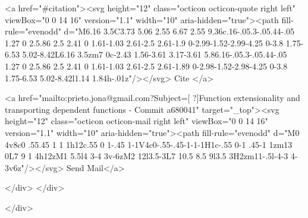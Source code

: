       <a  href="#citation"><svg height="12" class="octicon octicon-quote right left" viewBox="0 0 14 16" version="1.1" width="10" aria-hidden="true"><path fill-rule="evenodd" d="M6.16 3.5C3.73 5.06 2.55 6.67 2.55 9.36c.16-.05.3-.05.44-.05 1.27 0 2.5.86 2.5 2.41 0 1.61-1.03 2.61-2.5 2.61-1.9 0-2.99-1.52-2.99-4.25 0-3.8 1.75-6.53 5.02-8.42L6.16 3.5zm7 0c-2.43 1.56-3.61 3.17-3.61 5.86.16-.05.3-.05.44-.05 1.27 0 2.5.86 2.5 2.41 0 1.61-1.03 2.61-2.5 2.61-1.89 0-2.98-1.52-2.98-4.25 0-3.8 1.75-6.53 5.02-8.42l1.14 1.84h-.01z"/></svg> Cite
      </a>

      <a href="mailto:prieto.jona@gmail.com?Subject=[ ?]Function extensionality and transporting dependent functions  - Commit a680041" target="_top"><svg height="12" class="octicon octicon-mail right left" viewBox="0 0 14 16" version="1.1" width="10" aria-hidden="true"><path fill-rule="evenodd" d="M0 4v8c0 .55.45 1 1 1h12c.55 0 1-.45 1-1V4c0-.55-.45-1-1-1H1c-.55 0-1 .45-1 1zm13 0L7 9 1 4h12zM1 5.5l4 3-4 3v-6zM2 12l3.5-3L7 10.5 8.5 9l3.5 3H2zm11-.5l-4-3 4-3v6z"/></svg> Send Mail</a>

    </div>
  </div>

</div>




